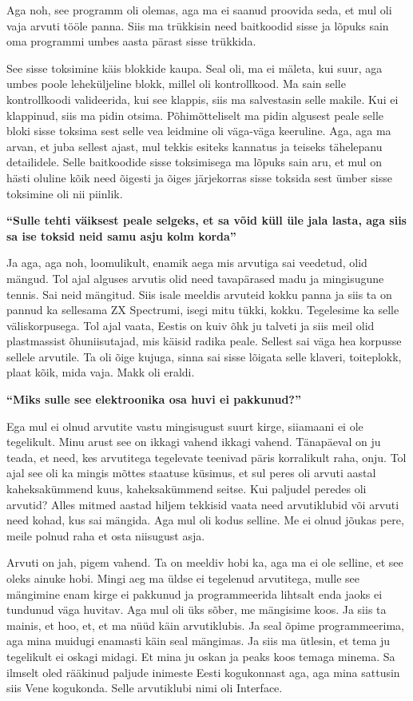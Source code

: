 Aga noh, see programm oli olemas, aga ma ei saanud proovida seda, et mul oli
vaja arvuti tööle panna. Siis ma trükkisin need baitkoodid sisse ja lõpuks
sain oma programmi umbes aasta pärast sisse trükkida.

See sisse toksimine käis blokkide kaupa. Seal oli, ma ei mäleta, kui suur, aga
umbes poole leheküljeline blokk, millel oli kontrollkood. Ma sain selle
kontrollkoodi valideerida, kui see klappis, siis ma salvestasin selle makile.
Kui ei klappinud, siis ma pidin otsima. Põhimõtteliselt ma pidin algusest peale
selle bloki sisse toksima sest selle vea leidmine oli väga-väga keeruline. Aga,
aga ma arvan, et juba sellest ajast, mul tekkis esiteks kannatus ja teiseks
tähelepanu detailidele. Selle baitkoodide sisse toksimisega ma lõpuks sain aru,
et mul on hästi oluline kõik need õigesti ja õiges järjekorras sisse toksida
sest ümber sisse toksimine oli nii piinlik.


\textbf{\enquote{Sulle tehti väiksest peale selgeks, et sa võid küll üle jala lasta, aga siis sa ise toksid neid samu asju kolm korda}}

Ja aga, aga noh, loomulikult, enamik aega mis arvutiga sai veedetud, olid
mängud. Tol ajal alguses arvutis olid need tavapärased madu ja mingisugune
tennis. Sai neid mängitud. Siis isale meeldis arvuteid kokku panna ja siis ta
on pannud ka sellesama ZX Spectrumi, isegi mitu
tükki, kokku. Tegelesime ka selle väliskorpusega. Tol ajal vaata, Eestis on
kuiv õhk ju talveti ja siis meil olid plastmassist õhuniisutajad, mis käisid
radika peale. Sellest sai väga hea korpusse sellele arvutile. Ta oli õige
kujuga, sinna sai sisse lõigata selle klaveri, toiteplokk, plaat kõik, mida
vaja. Makk oli eraldi.


\textbf{\enquote{Miks sulle see elektroonika osa huvi ei pakkunud?}}

Ega mul ei olnud arvutite vastu mingisugust suurt kirge, siiamaani ei ole
tegelikult. Minu arust see on ikkagi vahend ikkagi vahend. Tänapäeval on ju
teada, et need, kes arvutitega tegelevate teenivad päris korralikult raha,
onju. Tol ajal see oli ka mingis mõttes staatuse küsimus, et sul peres oli
arvuti aastal kaheksakümmend kuus, kaheksakümmend seitse. Kui paljudel peredes
oli arvutid? Alles mitmed aastad hiljem tekkisid vaata need arvutiklubid või
arvuti need kohad, kus sai mängida. Aga mul oli kodus selline. Me ei olnud
jõukas pere, meile polnud raha et osta niisugust asja. 

Arvuti on jah, pigem vahend. Ta on meeldiv hobi ka, aga ma ei ole selline, et
see oleks ainuke hobi. Mingi aeg ma üldse ei tegelenud arvutitega, mulle see
mängimine enam kirge ei pakkunud ja programmeerida lihtsalt enda jaoks ei
tundunud väga huvitav. Aga mul oli üks sõber, me mängisime koos. Ja siis ta
mainis, et hoo, et, et ma nüüd käin arvutiklubis. Ja seal õpime programmeerima,
aga mina muidugi enamasti käin seal mängimas. Ja siis ma ütlesin, et tema ju
tegelikult ei oskagi midagi. Et mina ju oskan ja peaks koos temaga minema. Sa
ilmselt oled rääkinud paljude inimeste Eesti kogukonnast aga, aga mina sattusin
siis Vene kogukonda. Selle arvutiklubi nimi oli
Interface.

